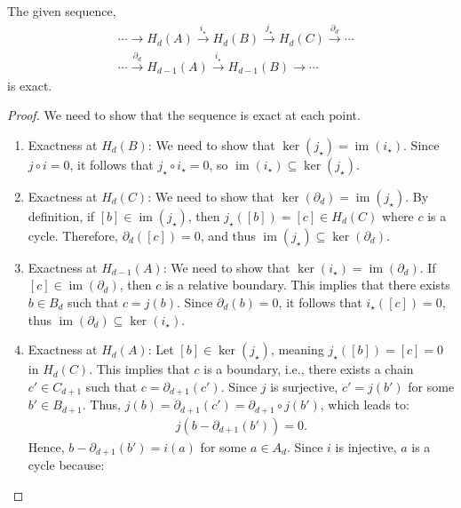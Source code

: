 \begin{lemma}{\cite[p.115ff]{hatcher2005algebraic}}
	\label{exacthomsequence}
	The given sequence,
	\begin{align}
		  & \cdots \rightarrow H_{d}(A) \xrightarrow{i_\star} H_{d}(B) \xrightarrow{j_\star} H_{d}(C) \xrightarrow{\partial_d} \cdots \\
		  & \cdots \xrightarrow{\partial_d} H_{d-1}(A) \xrightarrow{i_\star} H_{d-1}(B) \rightarrow \cdots                            
	\end{align}
	is exact.
\end{lemma}

\begin{proof}
	We need to show that the sequence is exact at each point. 
	\begin{enumerate}
		\item Exactness at \(H_{d}(B)\): We need to show that \(\ker(j_\star) = \operatorname{im}(i_\star)\). Since \(j \circ i = 0\), it follows that \(j_\star \circ i_\star = 0\), so \(\operatorname{im}(i_\star) \subseteq \ker(j_\star)\).
		\item Exactness at \(H_{d}(C)\): We need to show that \(\ker(\partial_d) = \operatorname{im}(j_\star)\). By definition, if \([b] \in \operatorname{im}(j_\star)\), then \(j_\star([b]) = [c] \in H_{d}(C)\) where \(c\) is a cycle. Therefore, \(\partial_d([c]) = 0\), and thus \(\operatorname{im}(j_\star) \subseteq \ker(\partial_d)\).
		\item Exactness at \(H_{d-1}(A)\): We need to show that \(\ker(i_\star) = \operatorname{im}(\partial_d)\). If \([c] \in \operatorname{im}(\partial_d)\), then \(c\) is a relative boundary. This implies that there exists \(b \in B_{d}\) such that \(c = j(b)\). Since \(\partial_d(b) = 0\), it follows that \(i_\star([c]) = 0\), thus \(\operatorname{im}(\partial_d) \subseteq \ker(i_\star)\).
		\item Exactness at \(H_{d}(A)\): Let \([b] \in \ker(j_\star)\), meaning \(j_\star([b]) = [c] = 0\) in \(H_{d}(C)\). This implies that \(c\) is a boundary, i.e., there exists a chain \(c' \in C_{d+1}\) such that \(c = \partial_{d+1}(c')\). Since \(j\) is surjective, \(c' = j(b')\) for some \(b' \in B_{d+1}\). Thus, \(j(b) = \partial_{d+1}(c') = \partial_{d+1}\circ j(b')\), which leads to:
		      \begin{align}
		      	j(b - \partial_{d+1}(b')) = 0. 
		      \end{align}
		      Hence, \(b - \partial_{d+1}(b') = i(a)\) for some \(a \in A_{d}\). Since \(i\) is injective, \(a\) is a cycle because:

\end{enumerate}
\end{proof}

